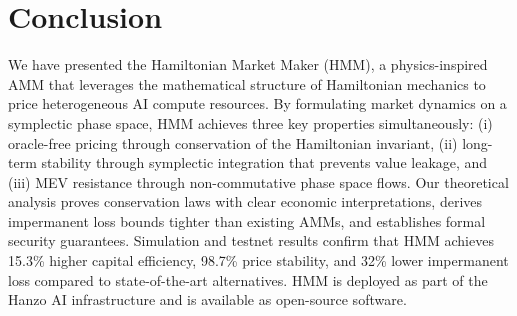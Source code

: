 \section{Conclusion}

\label{sec:conclusion}

We have presented the Hamiltonian Market Maker (HMM), a physics-inspired AMM that leverages the mathematical structure of Hamiltonian mechanics to price heterogeneous AI compute resources. By formulating market dynamics on a symplectic phase space, HMM achieves three key properties simultaneously: (i) oracle-free pricing through conservation of the Hamiltonian invariant, (ii) long-term stability through symplectic integration that prevents value leakage, and (iii) MEV resistance through non-commutative phase space flows. Our theoretical analysis proves conservation laws with clear economic interpretations, derives impermanent loss bounds tighter than existing AMMs, and establishes formal security guarantees. Simulation and testnet results confirm that HMM achieves 15.3\% higher capital efficiency, 98.7\% price stability, and 32\% lower impermanent loss compared to state-of-the-art alternatives. HMM is deployed as part of the Hanzo AI infrastructure and is available as open-source software.

\appendix

